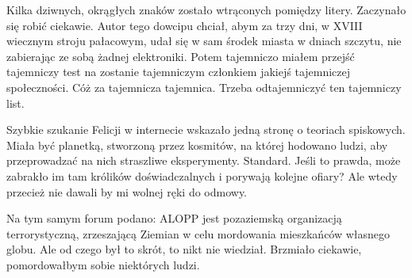 
Kilka dziwnych, okrągłych znaków zostało wtrąconych pomiędzy litery. 
Zaczynało się robić ciekawie. Autor tego dowcipu chciał, abym za trzy dni, w XVIII wiecznym stroju pałacowym,
udał się w sam środek miasta w dniach szczytu, nie zabierając ze sobą żadnej elektroniki.
Potem tajemniczo miałem przejść tajemniczy test na zostanie tajemniczym członkiem jakiejś tajemniczej społeczności. Cóż za tajemnicza tajemnica.
Trzeba odtajemniczyć ten tajemniczy list.

Szybkie szukanie Felicji w internecie wskazało jedną stronę o teoriach spiskowych.
Miała być planetką, stworzoną przez kosmitów, na której hodowano ludzi, aby przeprowadzać na nich straszliwe eksperymenty. Standard.
Jeśli to prawda, może zabrakło im tam królików doświadczalnych i porywają kolejne ofiary?
Ale wtedy przecież nie dawali by mi wolnej ręki do odmowy.

Na tym samym forum podano: ALOPP jest pozaziemską organizacją terrorystyczną, zrzeszającą Ziemian w celu mordowania mieszkańców własnego globu.
Ale od czego był to skrót, to nikt nie wiedział. Brzmiało ciekawie, pomordowałbym sobie niektórych ludzi.

